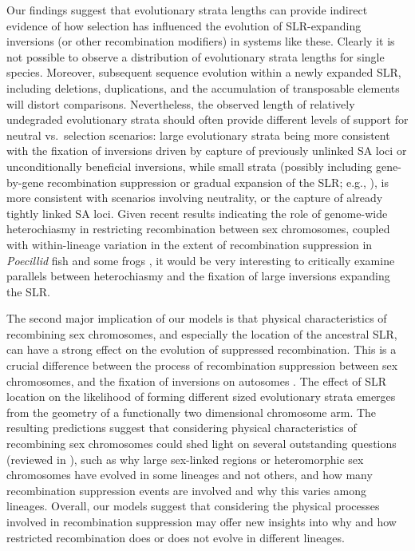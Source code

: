 \documentclass{article}[12pt]
\begin{document}
Our findings suggest that evolutionary strata lengths can provide indirect evidence of how selection has influenced the evolution of SLR-expanding inversions (or other recombination modifiers) in  systems like these. Clearly it is not possible to observe a distribution of evolutionary strata lengths for single species. Moreover, subsequent sequence evolution within a newly expanded SLR, including deletions, duplications, and the accumulation of transposable elements will distort comparisons. Nevertheless, the observed length of relatively undegraded evolutionary strata should often provide different levels of support for neutral vs.~selection scenarios: large evolutionary strata being more consistent with the fixation of inversions driven by capture of previously unlinked SA loci or unconditionally beneficial inversions, while small strata (possibly including gene-by-gene recombination suppression or gradual expansion of the SLR; e.g., \citealt{BergeroQiuCharlesworth2013, QiuBergeroCharlesworth2015}), is more consistent with scenarios involving neutrality, or the capture of already tightly linked SA loci. Given recent results indicating the role of genome-wide heterochiasmy in restricting recombination between sex chromosomes, coupled with within-lineage variation in the extent of recombination suppression in {\itshape Poecillid} fish and some frogs \citep[e.g.,][]{Wright2017, BergeroCharlesworth2019, DaroltiWrightMank2019, FurmanEvans2018}, it would be very interesting to critically examine parallels between heterochiasmy and the fixation of large inversions expanding the SLR.

The second major implication of our models is that physical characteristics of recombining sex chromosomes, and especially the location of the ancestral SLR, can have a strong effect on the evolution of suppressed recombination. This is a crucial difference between the process of recombination suppression between sex chromosomes, and the fixation of inversions on autosomes \citep{ConnallonOlito2021}. The effect of SLR location on the likelihood of forming different sized evolutionary strata emerges from the geometry of a functionally two dimensional chromosome arm. The resulting predictions suggest that considering physical characteristics of recombining sex chromosomes could shed light on several outstanding questions (reviewed in \citealt{Charlesworth2016, Charlesworth2017}), such as why large sex-linked regions or heteromorphic sex chromosomes have evolved in some lineages and not others, and how many recombination suppression events are involved and why this varies among lineages. Overall, our models suggest that considering the physical processes involved in recombination suppression may offer new insights into why and how restricted recombination does or does not evolve in different lineages.%
\end{document}
